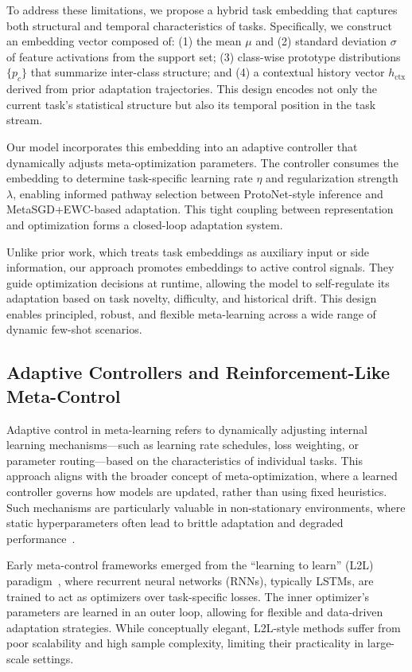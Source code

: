 \documentclass[conference]{IEEEtran}
\begin{document}
To address these limitations, we propose a hybrid task embedding that captures both structural and temporal characteristics of tasks. Specifically, we construct an embedding vector composed of: (1) the mean $\mu$ and (2) standard deviation $\sigma$ of feature activations from the support set; (3) class-wise prototype distributions $\{p_c\}$ that summarize inter-class structure; and (4) a contextual history vector $h_{\text{ctx}}$ derived from prior adaptation trajectories. This design encodes not only the current task’s statistical structure but also its temporal position in the task stream.

Our model incorporates this embedding into an adaptive controller that dynamically adjusts meta-optimization parameters. The controller consumes the embedding to determine task-specific learning rate $\eta$ and regularization strength $\lambda$, enabling informed pathway selection between ProtoNet-style inference and MetaSGD+EWC-based adaptation. This tight coupling between representation and optimization forms a closed-loop adaptation system.

Unlike prior work, which treats task embeddings as auxiliary input or side information, our approach promotes embeddings to active control signals. They guide optimization decisions at runtime, allowing the model to self-regulate its adaptation based on task novelty, difficulty, and historical drift. This design enables principled, robust, and flexible meta-learning across a wide range of dynamic few-shot scenarios.


\subsection{Adaptive Controllers and Reinforcement-Like Meta-Control}

Adaptive control in meta-learning refers to dynamically adjusting internal learning mechanisms—such as learning rate schedules, loss weighting, or parameter routing—based on the characteristics of individual tasks. This approach aligns with the broader concept of meta-optimization, where a learned controller governs how models are updated, rather than using fixed heuristics. Such mechanisms are particularly valuable in non-stationary environments, where static hyperparameters often lead to brittle adaptation and degraded performance~\cite{andrychowicz2016learning}.

Early meta-control frameworks emerged from the ``learning to learn'' (L2L) paradigm~\cite{hochreiter2001learning}, where recurrent neural networks (RNNs), typically LSTMs, are trained to act as optimizers over task-specific losses. The inner optimizer's parameters are learned in an outer loop, allowing for flexible and data-driven adaptation strategies. While conceptually elegant, L2L-style methods suffer from poor scalability and high sample complexity, limiting their practicality in large-scale settings.
\end{document}
